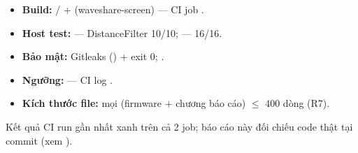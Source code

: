 \begin{itemize}
\item \textbf{Build:}  / 
  +  (waveshare-screen) — CI job .
\item \textbf{Host test:}  — DistanceFilter 10/10;
   — 16/16.
\item \textbf{Bảo mật:} Gitleaks () + 
  exit 0; .
\item \textbf{Ngưỡng:}  — CI log
  .
\item \textbf{Kích thước file:} mọi  (firmware + chương báo
  cáo) $\le$ 400 dòng (R7).
\end{itemize}

\noindent Kết quả CI run gần nhất xanh trên cả 2 job; báo cáo này đối chiếu
code thật tại commit (xem ).
